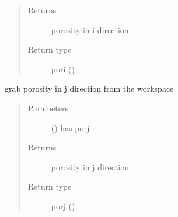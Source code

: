 \documentclass[letterpaper,10pt,english]{sphinxmanual}
\begin{document}
\begin{fulllineitems}
\begin{fulllineitems}
\begin{quote}
\begin{description}
\item[{Returns}] \leavevmode
\sphinxAtStartPar
porosity in i direction

\item[{Return type}] \leavevmode
\sphinxAtStartPar
pori ({\hyperref[\detokenize{autoapi/Field/index:Field.Field}]{}})

\end{description}\end{quote}

\end{fulllineitems}


\begin{fulllineitems}
\label{\detokenize{autoapi/NS_Airfoil/index:NS_Airfoil.NS_Airfoil.get_porj}}
\sphinxAtStartPar
grab porosity in j direction from the workspace
\begin{quote}\begin{description}
\item[{Parameters}] \leavevmode
\sphinxAtStartPar
{} ({\hyperref[\detokenize{autoapi/Workspace/index:Workspace.Workspace}]{}}) \textendash{} has porj

\item[{Returns}] \leavevmode
\sphinxAtStartPar
porosity in j direction

\item[{Return type}] \leavevmode
\sphinxAtStartPar
porj ({\hyperref[\detokenize{autoapi/Field/index:Field.Field}]{}})

\end{description}\end{quote}

\end{fulllineitems}



\end{fulllineitems}
\end{document}
